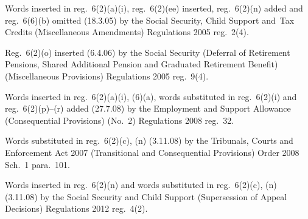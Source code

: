\documentclass[12pt,a4paper]{article}
\begin{document}
{Words inserted in reg.~6(2)(a)(i), reg.~6(2)(ee) inserted, reg.~6(2)(n) added and reg.~6(6)(b) omitted (18.3.05) by the Social Security, Child Support and~Tax Credits (Miscellaneous Amendments) Regulations 2005 reg.~2(4).

Reg.~6(2)(o) inserted (6.4.06) by the Social Security (Deferral of Retirement Pensions, Shared Additional Pension and Graduated Retirement Benefit) (Miscellaneous Provisions) Regulations 2005 reg.~9(4).

\begin{sloppypar}
Words inserted in reg.~6(2)(a)(i), (6)(a), words substituted in reg.~6(2)(i) and reg.~6(2)(p)--(r) added (27.7.08) by the Employment and Support Allowance (Consequential Provisions) (No.~2) Regulations 2008 reg.~32.
\end{sloppypar}

Words substituted in reg.~6(2)(c), (n) (3.11.08) by the Tribunals, Courts and Enforcement Act 2007 (Transitional and Consequential Provisions) Order 2008 Sch.~1 para.~101.

Words inserted in reg.~6(2)(n) and words substituted in reg.~6(2)(c), (n) (3.11.08) by the Social Security and Child Support (Supersession of Appeal Decisions) Regulations 2012 reg.~4(2).
}
\end{document}
